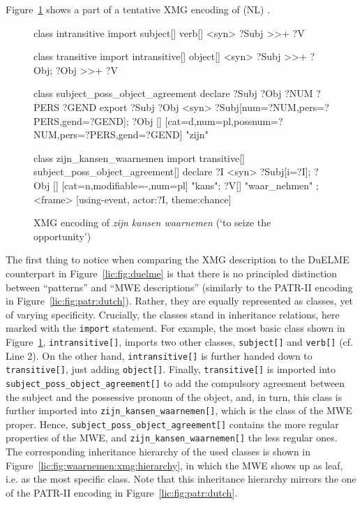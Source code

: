 \documentclass[output=paper
,modfonts
,nonflat
,biblatexbackend=biber
]{langsci/langscibook}
\begin{document}
Figure~\ref{lic:fig:waarnemen:xmg} shows a part of a tentative XMG encoding of (NL) .%
\begin{figure}[h]
\begin{xmg}
class intransitive
import subject[] verb[]
{ <syn> { ?Subj >>+ ?V }}

class transitive
import intransitive[] object[]
{ <syn> { ?Subj >>+ ?Obj;
          ?Obj >>+ ?V } }

class subject_poss_object_agreement
declare ?Subj ?Obj ?NUM ?PERS ?GEND
export ?Subj ?Obj
{ <syn> {
    ?Subj[num=?NUM,pers=?PERS,gend=?GEND];
    ?Obj [] {
      [cat=d,num=pl,possnum=?NUM,pers=?PERS,gend=?GEND] "zijn"}}}

class zijn_kansen_waarnemen 
import transitive[] subject_poss_object_agreement[]
declare ?I
{ <syn> {
    ?Subj[i=?I];
    ?Obj [] {
      [cat=n,modifiable=-,num=pl] "kans"};
    ?V[] "waar_nehmen" };
  <frame> {
     [using-event,
      actor:?I,
      theme:chance]}}
\end{xmg}
  \caption{XMG encoding of \textit{zijn kansen waarnemen} (`to seize the opportunity')}
  \label{lic:fig:waarnemen:xmg}
\end{figure}
The first thing to notice when comparing the XMG description to the DuELME counterpart in Figure~\ref{lic:fig:duelme} is that there is no principled distinction between ``patterns'' and ``MWE descriptions'' (similarly to the PATR-II encoding in Figure~\ref{lic:fig:patr:dutch}). Rather, they are equally represented as classes, yet of varying specificity. Crucially, the classes stand in inheritance relations, here marked with the \texttt{import} statement. For example, the most basic class shown in Figure~\ref{lic:fig:waarnemen:xmg}, \texttt{intransitive[]}, imports two other classes, \texttt{subject[]} and \texttt{verb[]} (cf. Line 2). On the other hand, \texttt{intransitive[]} is further handed down to \texttt{transitive[]}, just adding \texttt{object[]}. Finally, \texttt{transitive[]} is imported into \texttt{subject\_poss\_object\_agreement[]} to add the compulsory agreement between the subject and the possessive pronoun of the object, and, in turn, this class is further imported into \texttt{zijn\_kansen\_waarnemen[]}, which is the class of the MWE proper. Hence, \texttt{subject\_poss\_object\_agreement[]} contains the more regular properties of the MWE, and \texttt{zijn\_kansen\_waarnemen[]} the less regular ones. The corresponding inheritance hierarchy of the used classes is shown in Figure~\ref{lic:fig:waarnemen:xmg:hierarchy}, in which the MWE shows up as leaf, i.e. as the most specific class. Note that this inheritance hierarchy mirrors the one of the PATR-II encoding in Figure~\ref{lic:fig:patr:dutch}. 
\end{document}
